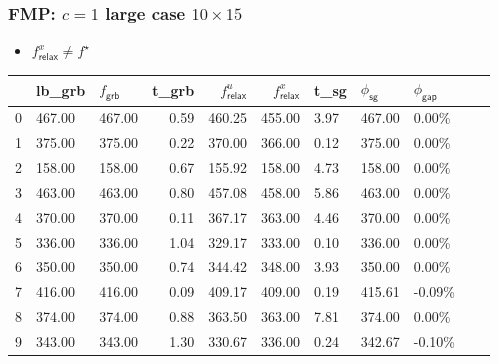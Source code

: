 \begin{frame}
  \frametitle{FMP: \(c = 1\) large case \(10\times 15\)}

  \begin{itemize}
    \item \(f^x_{\textsf{relax}} \neq f^\star\)
  \end{itemize}


  \scriptsize

  \begin{tabular}{lllrrrlllll}
    \toprule
    {} & lb\_grb                  & \(f_{\textsf{grb}}\)     & t\_grb
       & \(f^u_{\textsf{relax}}\) & \(f^x_{\textsf{relax}}\)
       & t\_sg                    & \(\phi_{\textsf{sg}}\)   & \(\phi_{\textsf{gap}}\)                                             \\
    \midrule
    0  & 467.00                   & 467.00                   & 0.59                    & 460.25 & 455.00 & 3.97 & 467.00 & 0.00\%  \\
    1  & 375.00                   & 375.00                   & 0.22                    & 370.00 & 366.00 & 0.12 & 375.00 & 0.00\%  \\
    2  & 158.00                   & 158.00                   & 0.67                    & 155.92 & 158.00 & 4.73 & 158.00 & 0.00\%  \\
    3  & 463.00                   & 463.00                   & 0.80                    & 457.08 & 458.00 & 5.86 & 463.00 & 0.00\%  \\
    4  & 370.00                   & 370.00                   & 0.11                    & 367.17 & 363.00 & 4.46 & 370.00 & 0.00\%  \\
    5  & 336.00                   & 336.00                   & 1.04                    & 329.17 & 333.00 & 0.10 & 336.00 & 0.00\%  \\
    6  & 350.00                   & 350.00                   & 0.74                    & 344.42 & 348.00 & 3.93 & 350.00 & 0.00\%  \\
    7  & 416.00                   & 416.00                   & 0.09                    & 409.17 & 409.00 & 0.19 & 415.61 & -0.09\% \\
    8  & 374.00                   & 374.00                   & 0.88                    & 363.50 & 363.00 & 7.81 & 374.00 & 0.00\%  \\
    9  & 343.00                   & 343.00                   & 1.30                    & 330.67 & 336.00 & 0.24 & 342.67 & -0.10\% \\
  \end{tabular}
  \normalsize


\end{frame}

